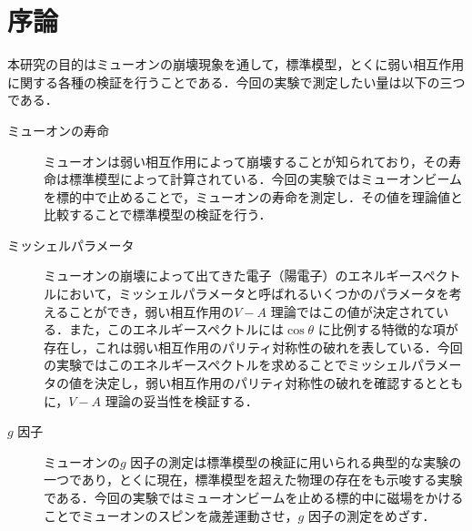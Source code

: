 





%

\section{序論}
本研究の目的はミューオンの崩壊現象を通して，標準模型，とくに弱い相互作用に関する各種の検証を行うことである．今回の実験で測定したい量は以下の三つである．

\begin{description}
\item[ミューオンの寿命]

ミューオンは弱い相互作用によって崩壊することが知られており，その寿命は標準模型によって計算されている．今回の実験ではミューオンビームを標的中で止めることで，ミューオンの寿命を測定し．その値を理論値と比較することで標準模型の検証を行う．
\item[ミッシェルパラメータ]

ミューオンの崩壊によって出てきた電子（陽電子）のエネルギースペクトルにおいて，ミッシェルパラメータと呼ばれるいくつかのパラメータを考えることができ，弱い相互作用の$V - A$ 理論ではこの値が決定されている．また，このエネルギースペクトルには$\cos \theta$ に比例する特徴的な項が存在し，これは弱い相互作用のパリティ対称性の破れを表している．今回の実験ではこのエネルギースペクトルを求めることでミッシェルパラメータの値を決定し，弱い相互作用のパリティ対称性の破れを確認するとともに，$V - A$ 理論の妥当性を検証する．
\item[$g$ 因子]

ミューオンの$g$ 因子の測定は標準模型の検証に用いられる典型的な実験の一つであり，とくに現在，標準模型を超えた物理の存在をも示唆する実験である．今回の実験ではミューオンビームを止める標的中に磁場をかけることでミューオンのスピンを歳差運動させ，$g$ 因子の測定をめざす．
\end{description}

